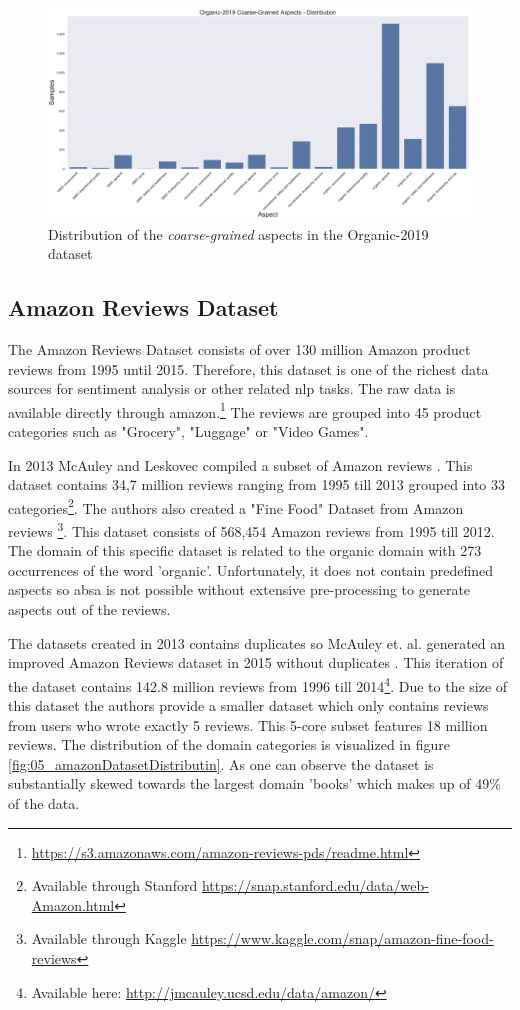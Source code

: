 \begin{figure}[ht]
	\centering
	\includegraphics[width=\textwidth]{figures/05_setup/05_organicCoarseGrained}
	\caption{Distribution of the \textit{coarse-grained} aspects in the Organic-2019 dataset}
	\label{fig:05_organic2019_coarse}
\end{figure}

\subsection{Amazon Reviews Dataset}
\label{sec:05_amazonReviews}
The Amazon Reviews Dataset consists of over 130 million Amazon product reviews from 1995 until 2015. Therefore, this dataset is one of the richest data sources for sentiment analysis or other related \gls{nlp} tasks. The raw data is available directly through amazon.\footnote{\url{https://s3.amazonaws.com/amazon-reviews-pds/readme.html}} The reviews are grouped into 45 product categories such as "Grocery", "Luggage" or "Video Games". 
\medskip

In 2013 McAuley and Leskovec compiled a subset of Amazon reviews \cite{McAuley2013}. This dataset contains 34,7 million reviews ranging from 1995 till 2013 grouped into 33 categories\footnote{Available through Stanford \url{https://snap.stanford.edu/data/web-Amazon.html}}. The authors also created a "Fine Food" Dataset from Amazon reviews \cite{McAuley2013a} \footnote{Available through Kaggle \url{https://www.kaggle.com/snap/amazon-fine-food-reviews}}. This dataset consists of 568,454 Amazon reviews from 1995 till 2012. The domain of this specific dataset is related to the organic domain with 273 occurrences of the word 'organic'. Unfortunately, it does not contain predefined aspects so \gls{absa} is not possible without extensive pre-processing to generate aspects out of the reviews.
\medskip

The datasets created in 2013 contains duplicates so McAuley et. al. generated an improved Amazon Reviews dataset in 2015 without duplicates \cite{McAuley2015}\cite{He2016}. This iteration of the dataset contains 142.8 million reviews from 1996 till 2014\footnote{Available here: \url{http://jmcauley.ucsd.edu/data/amazon/}}. Due to the size of this dataset the authors provide a smaller dataset which only contains reviews from users who wrote exactly 5 reviews. This 5-core subset features 18 million reviews. The distribution of the domain categories is visualized in figure \ref{fig:05_amazonDatasetDistributin}. As one can observe the dataset is substantially skewed towards the largest domain 'books' which makes up of 49\% of the data.
\medskip

